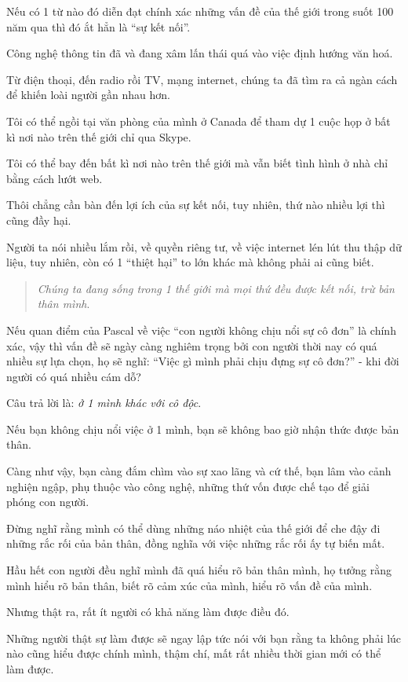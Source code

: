 \documentclass{book}
\numberwithin{equation}{section}
\begin{document}
Nếu có 1 từ nào đó diễn đạt chính xác những vấn đề của thế giới trong suốt 100 năm qua thì đó ắt hẳn là ``sự kết nối''.

%
Công nghệ thông tin đã và đang xâm lấn thái quá vào việc định hướng văn hoá.

Từ điện thoại, đến radio rồi TV, mạng internet, chúng ta đã tìm ra cả ngàn cách để khiến loài người gần nhau hơn.

Tôi có thể ngồi tại văn phòng của mình ở Canada để tham dự 1 cuộc họp ở bất kì nơi nào trên thế giới chỉ qua Skype.

Tôi có thể bay đến bất kì nơi nào trên thế giới mà vẫn biết tình hình ở nhà chỉ bằng cách lướt web.

Thôi chẳng cần bàn đến lợi ích của sự kết nối, tuy nhiên, thứ nào nhiều lợi thì cũng đầy hại.

Người ta nói nhiều lắm rồi, về quyền riêng tư, về việc internet lén lút thu thập dữ liệu, tuy nhiên, còn có 1 ``thiệt hại'' to lớn khác mà không phải ai cũng biết.

\begin{quotation}
    \textit{Chúng ta đang sống trong 1 thế giới mà mọi thứ đều được kết nối, trừ bản thân mình}.
\end{quotation}
Nếu quan điểm của Pascal về việc ``con người không chịu nổi sự cô đơn'' là chính xác, vậy thì vấn đề sẽ ngày càng nghiêm trọng bởi con người thời nay có quá nhiều sự lựa chọn, họ sẽ nghĩ: ``Việc gì mình phải chịu đựng sự cô đơn?'' - khi đời người có quá nhiều cám dỗ?

%
Câu trả lời là: \textit{ở 1 mình khác với cô độc}.

Nếu bạn không chịu nổi việc ở 1 mình, bạn sẽ không bao giờ nhận thức được bản thân.

Càng như vậy, bạn càng đắm chìm vào sự xao lãng và cứ thế, bạn lâm vào cảnh nghiện ngập, phụ thuộc vào công nghệ, những thứ vốn được chế tạo để giải phóng con người.

%
Đừng nghĩ rằng mình có thể dùng những náo nhiệt của thế giới để che đậy đi những rắc rối của bản thân, đồng nghĩa với việc những rắc rối ấy tự biến mất.

%
Hầu hết con người đều nghĩ mình đã quá hiểu rõ bản thân mình, họ tưởng rằng mình hiểu rõ bản thân, biết rõ cảm xúc của mình, hiểu rõ vấn đề của mình.

Nhưng thật ra, rất ít người có khả năng làm được điều đó.

Những người thật sự làm được sẽ ngay lập tức nói với bạn rằng ta không phải lúc nào cũng hiểu được chính mình, thậm chí, mất rất nhiều thời gian mới có thể làm được.
\end{document}
